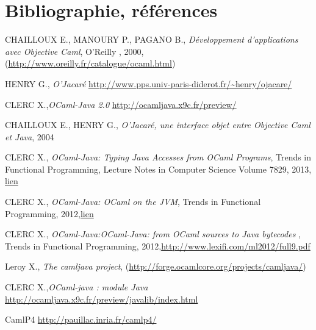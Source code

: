 \documentclass[a4paper, 11pt]{article}
\begin{document}

\newpage
\section*{Bibliographie, références}


\begin{thebibliography}{}
 CHAILLOUX E., MANOURY P., PAGANO B., \emph{Développement
  d'applications avec Objective Caml}, O'Reilly
, 2000, (\url{http://www.oreilly.fr/catalogue/ocaml.html})

 HENRY G., \emph{O’Jacaré} \url{http://www.pps.univ-paris-diderot.fr/~henry/ojacare/}

 CLERC X.,\emph{OCaml-Java 2.0} \url{http://ocamljava.x9c.fr/preview/}

 CHAILLOUX E., HENRY G., \emph{O’Jacaré, une interface objet
  entre Objective Caml et Java}, 2004

 CLERC X., \emph{OCaml-Java: Typing Java Accesses from OCaml
  Programs}, Trends in Functional Programming, Lecture Notes in
Computer Science Volume 7829,
2013, \href{http://www.cs.ru.nl/P.Achten/IFL2013/symposium_proceedings_IFL2013/ifl2013_submission_17.pdf}{lien}

 CLERC X., \emph{OCaml-Java: OCaml on the JVM}, Trends in
Functional Programming,
2012,\href{}{lien}

 CLERC X., \emph{OCaml-Java:OCaml-Java: from OCaml sources to Java bytecodes }, Trends in Functional Programming, 2012,\url{http://www.lexifi.com/ml2012/full9.pdf}

 Leroy X., \emph{The camljava project},
(\url{http://forge.ocamlcore.org/projects/camljava/})

 CLERC X.,\emph{OCaml-java : module Java} \url{http://ocamljava.x9c.fr/preview/javalib/index.html}

 CamlP4 \url{http://pauillac.inria.fr/camlp4/}


\end{thebibliography}
\end{document}
